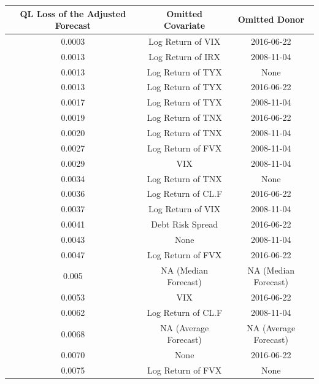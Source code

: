 \documentclass[11pt,3p,review,authoryear]{elsarticle}
\theoremstyle{definition}
\begin{document}
\begin{table}[ht]
  \centering
   \label{tab:prediction_table_with Brexit as June 22nd, 2016} 
  \begingroup\fontsize{7pt}{8pt}\selectfont
  \begin{tabular}{ccc}
    
    \hline
 QL Loss of the Adjusted Forecast& Omitted Covariate & Omitted Donor \\ 
    \hline
    0.0003 & Log Return of VIX & 2016-06-22 \\ 
    0.0013 & Log Return of IRX & 2008-11-04 \\ 
    0.0013 & Log Return of TYX & None \\ 
    0.0013 & Log Return of TYX & 2016-06-22 \\ 
    0.0017 & Log Return of TYX & 2008-11-04 \\ 
    0.0019 & Log Return of TNX & 2016-06-22 \\ 
    0.0020 & Log Return of TNX & 2008-11-04 \\ 
    0.0027 & Log Return of FVX & 2008-11-04 \\ 
    0.0029 & VIX & 2008-11-04 \\ 
    0.0034 & Log Return of TNX & None \\ 
    0.0036 & Log Return of CL.F & 2016-06-22 \\ 
    0.0037 & Log Return of VIX & 2008-11-04 \\ 
    0.0041 & Debt Risk Spread & 2016-06-22 \\ 
    0.0043 & None & 2008-11-04 \\ 
    0.0047 & Log Return of FVX & 2016-06-22 \\ 
    \rowcolor{gray} 0.005 & NA (Median Forecast) & NA (Median Forecast)\\  
    0.0053 & VIX & 2016-06-22 \\ 
    0.0062 & Log Return of CL.F & 2008-11-04 \\
    \rowcolor{gray} 0.0068 & NA (Average Forecast) & NA (Average Forecast)\\ 
 0.0070 & None & 2016-06-22 \\ 
    0.0075 & Log Return of FVX & None \\ 

\end{tabular}
\end{table}
\end{document}
